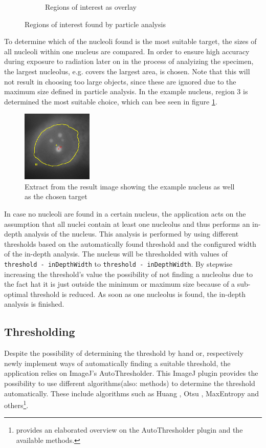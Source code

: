 \documentclass[a4paper, 12pt]{article}
\newcommand{\code}[1]{\colorbox{codegray}{\texttt{#1}}}
\begin{document}
\begin{figure}[h]
\begin{subfigure}[b]{0.23\textwidth}
\caption{Regions of interest as overlay}
\end{subfigure}
\caption{Regions of interest found by particle analysis}
\end{figure}

To determine which of the nucleoli found is the most suitable target, the sizes
of all nucleoli within one nucleus are compared. In order to ensure high
accuracy during exposure to radiation later on in the process of analyizing the
specimen, the largest nucleolus, e.g. covers the largest area, is chosen. Note
that this will not result in choosing too large objects, since these are ignored
due to the maximum size defined in particle analysis. In the example nucleus,
region 3 is determined the most suitable choice, which can bee seen in figure
\ref{fig:example_nucleus_target}. 

\begin{figure}
\centering
\includegraphics[width=0.3\textwidth]{images/example_nucleus_target}
\caption{Extract from the result image showing the example nucleus as well as
the chosen target}
\label{fig:example_nucleus_target}
\end{figure}

In case no nucleoli are found in a certain nucleus, the application acts on the
assumption that all nuclei contain at least one nucleolus and thus performs an
in-depth analysis of the nucleus. This analysis is performed by using different
thresholds based on the automatically found threshold and the configured width
of the in-depth analysis. The nucleus will be thresholded with values of
\code{threshold - inDepthWidth} to \code{threshold - inDepthWidth}. By
stepwise increasing the threshold's value the possibility of not finding a
nucleolus due to the fact hat it is just outside the minimum or maximum size
because of a sub-optimal threshold is reduced. As soon as one nucleolus is
found, the in-depth analysis is finished.

\subsection{Thresholding}\label{sec:thresholding}
Despite the possibility of determining the threshold by hand or, respectively
newly implement ways of automatically finding a suitable threshold, the
application relies on ImageJ's AutoThresholder. This ImageJ plugin provides the
possibility to use different algorithms(also: methods) to determine the
threshold automatically.
These include algorithms such as Huang \cite{huang93}, Otsu \cite{green10},
MaxEntropy \cite{fiji04} and others\footnote{\cite{landini13} provides an
elaborated overview on the AutoThresholder plugin and the available methods.}.
\end{document}
